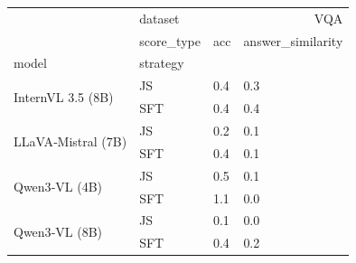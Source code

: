 \begin{tabular}{llll}
\toprule
 & dataset & \multicolumn{2}{r}{VQA} \\
 & score_type & acc & answer_similarity \\
model & strategy &  &  \\
\midrule
\multirow[t]{2}{*}{InternVL 3.5 (8B)} & JS & 0.4 & 0.3 \\
 & SFT & 0.4 & 0.4 \\
\cline{1-4}
\multirow[t]{2}{*}{LLaVA‑Mistral (7B)} & JS & 0.2 & 0.1 \\
 & SFT & 0.4 & 0.1 \\
\cline{1-4}
\multirow[t]{2}{*}{Qwen3‑VL (4B)} & JS & 0.5 & 0.1 \\
 & SFT & 1.1 & 0.0 \\
\cline{1-4}
\multirow[t]{2}{*}{Qwen3‑VL (8B)} & JS & 0.1 & 0.0 \\
 & SFT & 0.4 & 0.2 \\
\cline{1-4}
\bottomrule
\end{tabular}
